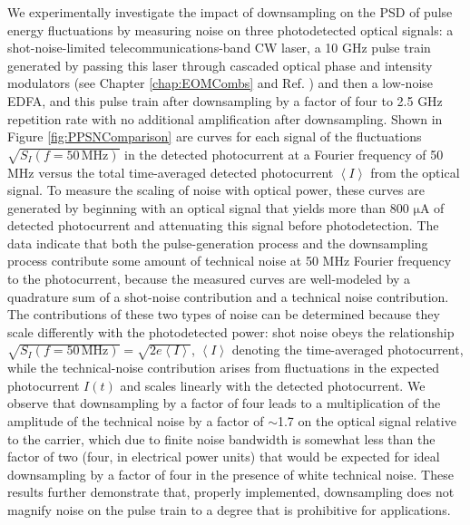 We experimentally investigate the impact of downsampling on the PSD of pulse energy fluctuations by measuring noise on three photodetected optical signals: a shot-noise-limited telecommunications-band CW laser, a 10 GHz pulse train generated by passing this laser through cascaded optical phase and intensity modulators (see Chapter \ref{chap:EOMCombs} and Ref. ) and then a low-noise EDFA, and this pulse train after downsampling by a factor of four to 2.5 GHz repetition rate with no additional amplification after downsampling. Shown in Figure \ref{fig:PPSNComparison} are curves for each signal of the fluctuations $\sqrt{S_I (f=50\, \mathrm{MHz})}$ in the detected photocurrent at a Fourier frequency of 50 MHz versus the total time-averaged detected photocurrent $\left<I\right>$ from the optical signal. To measure the scaling of noise with optical power, these curves are generated by beginning with an optical signal that yields more than 800 $\mathrm{\mu}$A of detected photocurrent and attenuating this signal before photodetection. The data indicate that both the pulse-generation process and the downsampling process contribute some amount of technical noise at 50 MHz Fourier frequency to the photocurrent, because the measured curves are well-modeled by a quadrature sum of a shot-noise contribution and a technical noise contribution. The contributions of these two types of noise can be determined because they scale differently with the photodetected power: shot noise obeys the relationship  $\sqrt{S_I (f=50\, \mathrm{MHz})}=\sqrt{2e\left<I\right>}$, $\left<I\right>$ denoting the time-averaged photocurrent, while the technical-noise contribution arises from fluctuations in the expected photocurrent $I(t)$  and scales linearly with the detected photocurrent. We observe that downsampling by a factor of four leads to a multiplication of the amplitude of the technical noise by a factor of $\sim$1.7 on the optical signal relative to the carrier, which due to finite noise bandwidth is somewhat less than the factor of two (four, in electrical power units) that would be expected for ideal downsampling by a factor of four in the presence of white technical noise. These results further demonstrate that, properly implemented, downsampling does not magnify noise on the pulse train to a degree that is prohibitive for applications.

